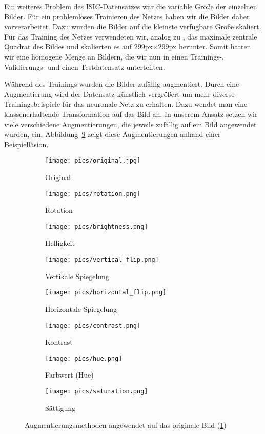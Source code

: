 Ein weiteres Problem des ISIC-Datensatzes war die variable Größe der einzelnen Bilder. Für ein problemloses Trainieren des Netzes haben wir die Bilder daher vorverarbeitet. Dazu wurden die Bilder auf die kleinste verfügbare Größe skaliert. Für das Training des Netzes verwendeten wir, analog zu \citet{esteva2017dermatologist}, das maximale zentrale Quadrat des Bildes und skalierten es auf $299$px$\times 299$px herunter. Somit hatten wir eine homogene Menge an Bildern, die wir nun in einen Trainings-, Validierungs- und einen Testdatensatz unterteilten.

Während des Trainings wurden die Bilder zufällig augmentiert. Durch eine Augmentierung wird der Datensatz künstlich vergrößert um mehr diverse Trainingsbeispiele für das neuronale Netz zu erhalten. Dazu wendet man eine klassenerhaltende Transformation auf das Bild an. In unserem Ansatz setzen wir viele verschiedene Augmentierungen, die jeweils zufällig auf ein Bild angewendet wurden, ein. Abbildung~\ref{fig:aug} zeigt diese Augmentierungen anhand einer Beispielläsion.

\begin{figure}[t]
	\centering
	\begin{subfigure}[t]{0.24\linewidth}
		\texttt{[image: pics/original.jpg]}
		\caption{Original}
		\label{subfig:aug_original}
	\end{subfigure}
	\begin{subfigure}[t]{0.24\linewidth}
		\texttt{[image: pics/rotation.png]}
		\caption{Rotation}
		\label{subfig:aug_rot}
	\end{subfigure}
	\begin{subfigure}[t]{0.24\linewidth}
		\texttt{[image: pics/brightness.png]}
		\caption{Helligkeit}
		\label{subfig:aug_bright}
	\end{subfigure}
	\begin{subfigure}[t]{0.24\linewidth}
		\texttt{[image: pics/vertical\_flip.png]}
		\caption{Vertikale Spiegelung}
		\label{subfig:aug_v_flip}
	\end{subfigure}
	\begin{subfigure}[t]{0.24\linewidth}
		\texttt{[image: pics/horizontal\_flip.png]}
		\caption{Horizontale Spiegelung}
		\label{subfig:aug_h_flip}
	\end{subfigure}
	\begin{subfigure}[t]{0.24\linewidth}
		\texttt{[image: pics/contrast.png]}
		\caption{Kontrast}
		\label{subfig:aug_contrast}
	\end{subfigure}
	\begin{subfigure}[t]{0.24\linewidth}
		\texttt{[image: pics/hue.png]}
		\caption{Farbwert (Hue)}
		\label{subfig:aug_hue}
	\end{subfigure}
	\begin{subfigure}[t]{0.24\linewidth}
		\texttt{[image: pics/saturation.png]}
		\caption{Sättigung}
		\label{subfig:aug_sat}
	\end{subfigure}
	\caption{Augmentierungsmethoden angewendet auf das originale Bild (\ref{subfig:aug_original})}
    \label{fig:aug}
\end{figure}


